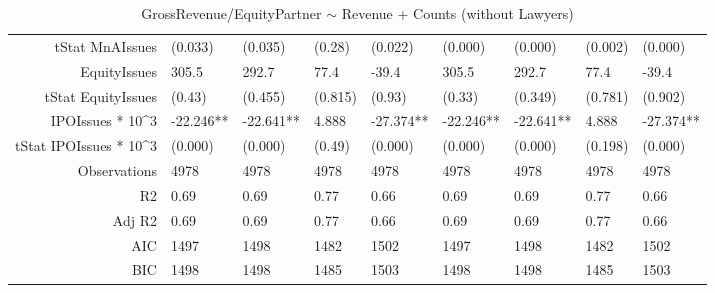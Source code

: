\begin{table}[ht]
\begin{tabular}{rllllllll}
  tStat MnAIssues & (0.033) & (0.035) & (0.28) & (0.022) & (0.000) & (0.000) & (0.002) & (0.000) \\ 
  EquityIssues & 305.5 & 292.7 & 77.4 & -39.4 & 305.5 & 292.7 & 77.4 & -39.4 \\ 
  tStat EquityIssues & (0.43) & (0.455) & (0.815) & (0.93) & (0.33) & (0.349) & (0.781) & (0.902) \\ 
  IPOIssues * 10^3 & -22.246** & -22.641** & 4.888 & -27.374** & -22.246** & -22.641** & 4.888 & -27.374** \\ 
  tStat IPOIssues * 10^3 & (0.000) & (0.000) & (0.49) & (0.000) & (0.000) & (0.000) & (0.198) & (0.000) \\ 
  Observations & 4978 & 4978 & 4978 & 4978 & 4978 & 4978 & 4978 & 4978 \\ 
  R2 & 0.69 & 0.69 & 0.77 & 0.66 & 0.69 & 0.69 & 0.77 & 0.66 \\ 
  Adj R2 & 0.69 & 0.69 & 0.77 & 0.66 & 0.69 & 0.69 & 0.77 & 0.66 \\ 
  AIC & 1497 & 1498 & 1482 & 1502 & 1497 & 1498 & 1482 & 1502 \\ 
  BIC & 1498 & 1498 & 1485 & 1503 & 1498 & 1498 & 1485 & 1503 \\ 
   \hline
\end{tabular}
\caption{GrossRevenue/EquityPartner $\sim$ Revenue + Counts (without Lawyers)} 
\end{table}
